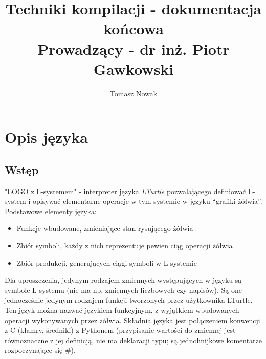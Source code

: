 \documentclass{article}
\title{%
  Techniki kompilacji - dokumentacja końcowa \\
  \large Prowadzący - dr inż. Piotr Gawkowski
}
\author{Tomasz Nowak}
\date{}
\begin{document}
\maketitle


\section{Opis języka}

\subsection{Wstęp}
"LOGO z L-systemem" - interpreter języka \textit{LTurtle} pozwalającego definiować L-system i opisywać elementarne operacje w tym systemie w języku “grafiki żółwia”.
\newline{}
Podstawowe elementy języka:
\begin{itemize}
    \item{Funkcje wbudowane, zmieniające stan rysującego żółwia}
    \item{Zbiór symboli, każdy z nich reprezentuje pewien ciąg operacji żółwia}
    \item{Zbiór produkcji, generujących ciągi symboli w L-systemie}
\end{itemize}
Dla uproszczenia, jedynym rodzajem zmiennych występujących w języku są symbole L-systemu (nie ma np. zmiennych liczbowych czy napisów). Są one jednocześnie jedynym rodzajem funkcji tworzonych przez użytkownika  LTurtle. Ten język można nazwać językiem funkcyjnym, z wyjątkiem wbudowanych operacji wykonywanych przez żółwia. Składnia języka jest połączeniem konwencji z C (klamry, średniki) z Pythonem (przypisanie wartości do zmiennej jest równoznaczne z jej definicją, nie ma deklaracji typu; są jednolinijkowe komentarze rozpoczynające się \#).
\end{document}
